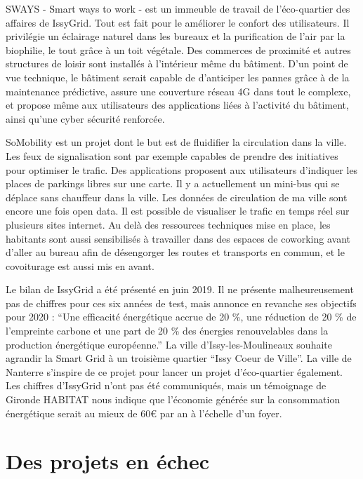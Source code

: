 SWAYS - Smart ways to work - est un immeuble de travail de l'éco-quartier des affaires de IssyGrid. 
Tout est fait pour le améliorer le confort des utilisateurs.
Il privilégie un éclairage naturel dans les bureaux et la purification de l'air par la biophilie, 
le tout grâce à un toit végétale. Des commerces de proximité et autres structures de loisir
sont installés à l'intérieur même du bâtiment. D'un point de vue technique, le bâtiment serait 
capable de d'anticiper les pannes grâce à de la maintenance prédictive, assure une couverture réseau
4G dans tout le complexe, et propose même aux utilisateurs des applications liées à l'activité du 
bâtiment, ainsi qu'une cyber sécurité renforcée. 

SoMobility est un projet dont le but est de fluidifier la circulation dans la ville. Les feux de 
signalisation sont par exemple capables de prendre des initiatives pour optimiser le trafic. 
Des applications proposent aux utilisateurs d'indiquer les places de parkings libres sur une carte.
Il y a actuellement un mini-bus qui se déplace sans chauffeur dans la ville. 
Les données de circulation de ma ville sont encore une fois open data. Il est possible de visualiser 
le trafic en temps réel sur plusieurs sites internet. 
Au delà des ressources techniques mise en place, les habitants sont aussi sensibilisés à travailler 
dans des espaces de coworking avant d'aller au bureau afin de désengorger les routes et transports 
en commun, et le covoiturage est aussi mis en avant. 

Le bilan de IssyGrid a été présenté en juin 2019. 
Il ne présente malheureusement pas de chiffres pour ces six années de test, mais annonce en revanche 
ses objectifs pour 2020 : ``Une efficacité énergétique accrue de 20 \%, une réduction de 20 \% 
de l’empreinte carbone et une part de 20 \% des énergies renouvelables dans la production 
énergétique européenne.''
La ville d'Issy-les-Moulineaux souhaite agrandir la Smart Grid à un troisième quartier 
``Issy Coeur de Ville''. La ville de Nanterre s'inspire de ce projet pour lancer un projet 
d'éco-quartier également. 
Les chiffres d'IssyGrid n'ont pas été communiqués, mais un témoignage de Gironde HABITAT nous indique
que l'économie générée sur la consommation énergétique serait au mieux de 60€ par an à l'échelle d'un
foyer.

\section{Des projets en échec}

